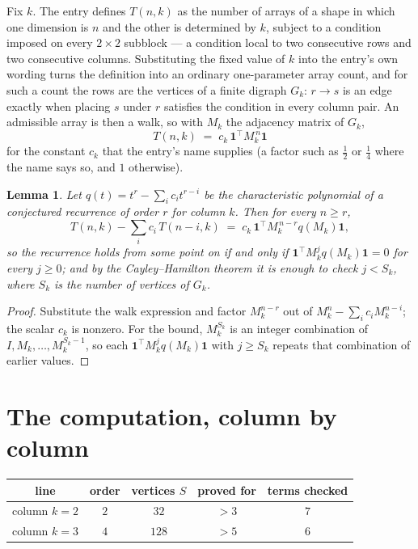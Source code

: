 \documentclass[11pt,a4paper]{article}
\theoremstyle{plain}
\newtheorem{lemma}[theorem]{Lemma}
\theoremstyle{definition}
\begin{document}
Fix $k$. The entry defines $T(n,k)$ as the number of arrays of a shape in which one dimension
is $n$ and the other is determined by $k$, subject to a condition imposed on every
$2\times2$ subblock --- a condition local to two consecutive rows and two consecutive columns.
Substituting the fixed value of $k$ into the entry's own wording turns the definition into an
ordinary one-parameter array count, and for such a count the rows are the vertices of a finite
digraph $G_k$: $r\to s$ is an edge exactly when placing $s$ under $r$ satisfies the condition
in every column pair. An admissible array is then a walk, so with $M_k$ the adjacency matrix
of $G_k$,
\[
T(n,k)\;=\;c_k\,\mathbf{1}^{\!\top}M_k^{\,n}\mathbf{1}
\]
for the constant $c_k$ that the entry's name supplies (a factor such as $\tfrac12$ or
$\tfrac14$ where the name says so, and $1$ otherwise).

\begin{lemma}\label{lem:crit}
Let $q(t)=t^{r}-\sum_i c_it^{r-i}$ be the characteristic polynomial of a conjectured
recurrence of order $r$ for column $k$. Then for every $n\ge r$,
\[
T(n,k)-\sum_i c_i\,T(n-i,k)\;=\;c_k\,\mathbf{1}^{\!\top}M_k^{\,n-r}q(M_k)\mathbf{1},
\]
so the recurrence holds from some point on if and only if
$\mathbf{1}^{\!\top}M_k^{j}q(M_k)\mathbf{1}=0$ for every $j\ge0$; and by the
Cayley--Hamilton theorem it is enough to check $j<S_k$, where $S_k$ is the number of vertices
of $G_k$.
\end{lemma}

\begin{proof}
Substitute the walk expression and factor $M_k^{n-r}$ out of $M_k^{n}-\sum_ic_iM_k^{n-i}$;
the scalar $c_k$ is nonzero. For the bound, $M_k^{S_k}$ is an integer combination of
$I,M_k,\dots,M_k^{S_k-1}$, so each $\mathbf{1}^{\!\top}M_k^{j}q(M_k)\mathbf{1}$ with
$j\ge S_k$ repeats that combination of earlier values.
\end{proof}

\section{The computation, column by column}

\begin{center}
\begin{tabular}{ccccc}
line & order & vertices $S$ & proved for & terms checked \\ \hline
column $k$$=2$ & $2$ & $32$ & $>3$ & $7$ \\
column $k$$=3$ & $4$ & $128$ & $>5$ & $6$ \\
\end{tabular}
\end{center}
\end{document}
